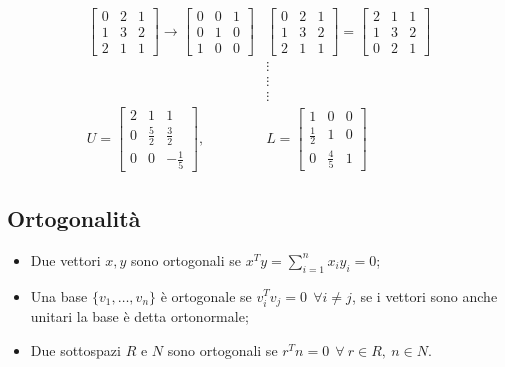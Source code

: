 \documentclass{article}
\begin{document}
\begin{align*}
    \\
    \begin{bmatrix}
        0 & 2 & 1\\
        1 & 3 & 2\\
        2 & 1 & 1
    \end{bmatrix}\rightarrow
    \begin{bmatrix}
        0 & 0 & 1\\
        0 & 1 & 0\\
        1 & 0 & 0
    \end{bmatrix}&
    \begin{bmatrix}
        0 & 2 & 1\\
        1 & 3 & 2\\
        2 & 1 & 1
    \end{bmatrix}=
    \begin{bmatrix}
        2 & 1 & 1\\
        1 & 3 & 2\\
        0 & 2 & 1
    \end{bmatrix}
    \\
    &\vdots
    \\
    &\vdots
    \\
    &\vdots
    \\
    U=\begin{bmatrix}
        2 & 1 & 1\\
        0 & \frac{5}{2} & \frac{3}{2}\\
        0 & 0 & -\frac{1}{5}
    \end{bmatrix},\quad &L=
    \begin{bmatrix}
        1 & 0 & 0\\
        \frac{1}{2} & 1 & 0\\
        0 & \frac{4}{5} & 1
    \end{bmatrix}  
\end{align*}

\newpage

\subsection{Ortogonalità}

\begin{itemize}
    \item Due vettori $x,y$ sono ortogonali se $x^Ty=\sum_{i=1}^{n}x_i y_i=0$;
    \item Una base $\{v_1,\ldots,v_n\}$ è ortogonale se $v_i^Tv_j=0 \ \ \forall i\neq j$, se i vettori sono anche unitari la base è detta ortonormale;
    \item Due sottospazi $R$ e $N$ sono ortogonali se $r^Tn=0\ \ \forall\ r\in R,\ n\in N$.\newline
\end{itemize}
\end{document}
